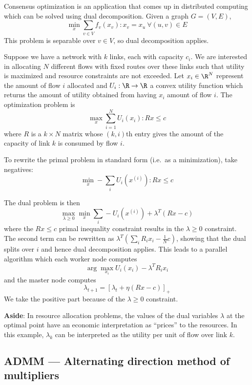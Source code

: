 \begin{example}
Consensus optimization is an
application that comes up in distributed computing which can be solved
using dual decomposition. Given a graph $G = (V, E)$,
\[
\min_x \sum_{v \in V} f_v(x_v) : x_v = x_u~\forall(u,v) \in E
\]
This problem is separable over $v \in V$, so dual decomposition applies.

\end{example}

\begin{example}
Suppose we have a
network with $k$ links, each with capacity $c_i$. We are interested
in allocating $N$ different flows with fixed routes over these links such that
utility is maximized and resource constraints are not exceeded.
Let $x_i \in \R^N$ represent the amount of flow $i$ allocated and
$U_i : \R \to \R$ a convex utility function which
returns the amount of utility obtained from having $x_i$ amount of
flow $i$. The optimization problem is
\[
\max_x \sum_{i=1}^N U_i(x_i) : R x \leq c
\]
where $R$ is a $k \times N$ matrix whose $(k,i)$th entry gives the
amount of the capacity of link $k$ is consumed by flow $i$.

To rewrite the primal problem in standard form (i.e.~as a minimization),
take negatives:
\[
\min_x -\sum_i U_i(x^{(i)}) : R x \leq c
\]

The dual problem is then
\[
\max_{\lambda \geq 0} \min_x \sum_i -U_i(x^{(i)}) + \lambda^T (R x - c)
\]
where the $R x \leq c$ primal inequality constraint results in the $\lambda \geq 0$ constraint.
The second term can be rewritten as $\lambda^T\left(\sum_i R_i x_i - \frac{1}{N}c\right)$,
showing that the dual splits over $i$ and hence dual decomposition applies. This leads to a
parallel algorithm which each worker node computes
\[
\arg\max_{x_i} U_i(x_i) - \lambda^T R_i x_i
\]
and the master node computes
\[
\lambda_{t+1} = \left[\lambda_t + \eta (R x - c)\right]_+
\]
We take the positive part because of the $\lambda \geq 0$ constraint.

\textbf{Aside}: In resource allocation problems, the values of the dual variables
$\lambda$ at the optimal point have an economic interpretation as
``prices'' to the resources. In this example, $\lambda_k$ can be
interpreted as the utility per unit of flow over link $k$.
\end{example}

\subsection{ADMM --- Alternating direction method of multipliers}

